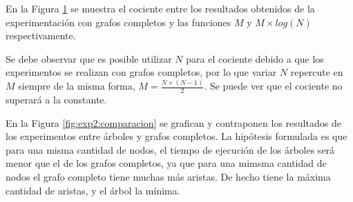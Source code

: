     En la Figura \ref{fig:exp2:completos:cociente} se muestra el cociente entre los resultados obtenidos de la experimentación con grafos completos y las funciones $M$ y $M \times log(N)$ respectivamente.

    Se debe observar que es posible utilizar $N$ para el cociente debido a que los experimentos se realizan con grafos completos, por lo que variar $N$ repercute en $M$ siempre de la misma forma, $M = \frac{N \times (N - 1)}{2}$. Se puede ver que el cociente no superará a la constante.

    \begin{figure}[H]
        \centering
        \caption{}
        \label{fig:exp2:completos:cociente}
    \end{figure}

    En la Figura \ref{fig:exp2:comparacion} se grafican y contraponen los resultados de los experimentos entre árboles y grafos completos. La hipótesis formulada es que para una misma cantidad de nodos, el tiempo de ejecución de los árboles será menor que el de los grafos completos, ya que para una mimsma cantidad de nodos el grafo completo tiene muchas más aristas. De hecho tiene la máxima cantidad de aristas, y el árbol la mínima.

